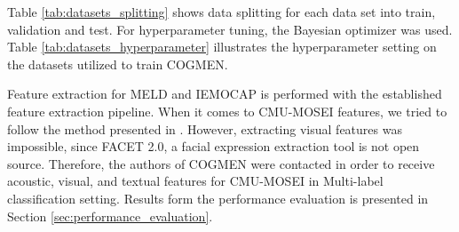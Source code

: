 Table \ref{tab:datasets_splitting} shows data splitting for each data set into train, validation and test. For hyperparameter tuning, the Bayesian optimizer was used. Table \ref{tab:datasets_hyperparameter} illustrates the hyperparameter setting on the datasets utilized to train COGMEN. 
%
\begin{table}[h]
\caption{Data splitting.}
\centering
{}
\label{tab:datasets_splitting}
\end{table}
%
%
\begin{table}[h]
\caption{Hyperparameter settings for each dataset. \textit{ILR} denotes initial learning rate.}
\centering
{}
\label{tab:datasets_hyperparameter}
\end{table}
%
Feature extraction for MELD and IEMOCAP is performed with the established feature extraction pipeline. When it comes to CMU-MOSEI features, we tried to follow the method presented in \cite{cmu-mosei_zadeh2018multimodal}. However, extracting visual features was impossible, since FACET 2.0, a facial expression extraction tool is not open source. Therefore, the authors of COGMEN were contacted in order to receive acoustic, visual, and textual features for CMU-MOSEI in Multi-label classification setting. Results form the performance evaluation is presented in Section \ref{sec:performance_evaluation}.

